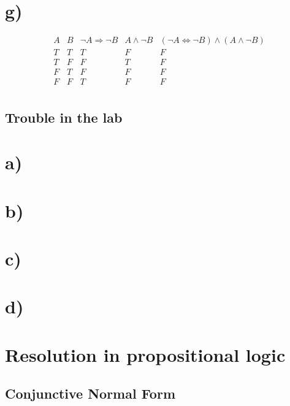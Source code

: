 \documentclass{article}
\begin{document}
\section*{g)}
\begin{displaymath}
\begin{array}{|c|c|c|c|c|c}

A & 
B & 
\neg A \Rightarrow \neg B & 
A \wedge \neg B &
(\neg A \Leftrightarrow \neg B) \wedge (A \wedge \neg B)\\ %
\hline  %
T & T & T & F & F\\
T & F & F & T & F\\
F & T & F & F & F\\
F & F & T & F & F\\

\end{array}
\end{displaymath}

\subsection{Trouble in the lab}

\section*{a)}

\section*{b)}

\section*{c)}

\section*{d)}

\section{Resolution in propositional logic}

\subsection{Conjunctive Normal Form}
\end{document}

